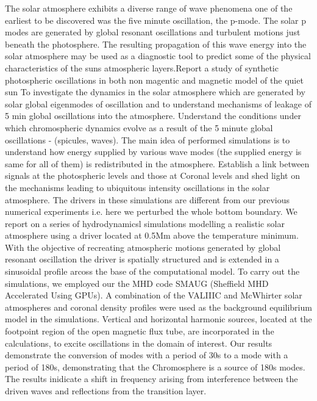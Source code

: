 \documentclass{aa}
\begin{document}
  \abstract
   { The solar atmosphere exhibits a diverse range of wave phenomena one of the earliest to be discovered was the five minute oscillation, the p-mode. The solar p modes are generated by global resonant oscillations and turbulent motions just beneath the photosphere. The resulting propagation of this wave energy into the solar atmosphere may be used as a diagnostic tool to predict some of the physical characteristics of the  suns atmospheric layers.Report a study of synthetic photospheric oscillations in both non magentic and magnetic  model of the quiet sun}
   {To investigate the dynamics in the solar atmosphere which are generated by solar global eigenmodes of oscillation and to understand mechanisms of leakage of 5 min global oscillations into the atmosphere. Understand the conditions under which chromospheric dynamics evolve as a result of the 5 minute global oscillations - (spicules, waves).  The main idea of performed simulations is to understand how energy supplied by various wave modes (the supplied energy is same for all of them) is redistributed in the atmosphere. Establish a link between signals at the photospheric levels and those at Coronal levels and shed light on the mechanisms leading to ubiquitous intensity oscillations in the solar atmosphere. The drivers in these simulations are different from our previous numerical experiments i.e. here we perturbed the whole bottom boundary.
}
   {  We report on a series of hydrodynamicsl simulations modelling a realistic solar atmosphere using a driver located at 0.5Mm above the temperature minimum. With the objective of recreating atmospheric motions generated by global resonant oscillation the driver is spatially structured and is extended in a sinusoidal profile arcoss the base of the computational model.  To carry out the simulations, we employed our the MHD code SMAUG (Sheffield MHD Accelerated Using GPUs). A combination of the VALIIIC and McWhirter solar atmospheres and coronal density profiles were used as the background equilibrium
model in the simulations. Vertical and horizontal harmonic sources, located at the footpoint region of the open magnetic flux tube, are incorporated in the calculations, to excite oscillations in the domain of interest.}
   {Our results demonstrate the conversion of modes with a period of 30s to a mode with a period of 180s, demonstrating that the Chromosphere is a source of 180s modes. The results inidicate a shift in frequency arising from interference between the driven waves and reflections from the transition layer.}
\end{document}
